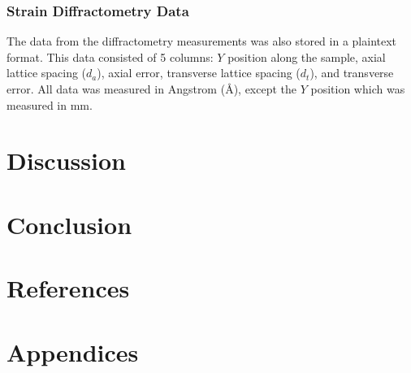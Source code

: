 \documentclass[11pt, oneside]{article}   	%
\begin{document}
\subsubsection{Strain Diffractometry Data}
The data from the diffractometry measurements was also stored in a plaintext format. This data consisted of 5 columns: $Y$ position along the sample, axial lattice spacing ($d_a$), axial error, transverse lattice spacing ($d_t$), and transverse error. All data was measured in Angstrom (\si{\angstrom}), except the $Y$ position which was measured in \si{\milli\meter}.
\section{Discussion}
\section{Conclusion}
\section{References}
\section{Appendices}
\end{document}
